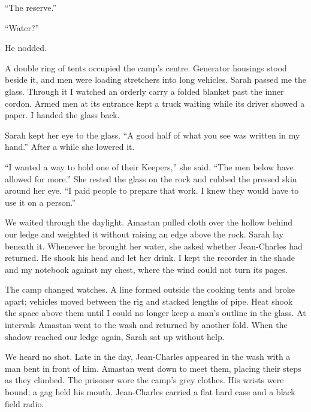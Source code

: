 ``The reserve.''\par

``Water?''\par

He nodded.\par

A double ring of tents occupied the camp's centre. Generator housings stood beside it, and men were loading stretchers into long vehicles. Sarah passed me the glass. Through it I watched an orderly carry a folded blanket past the inner cordon. Armed men at its entrance kept a truck waiting while its driver showed a paper. I handed the glass back.\par

Sarah kept her eye to the glass. ``A good half of what you see was written in my hand.'' After a while she lowered it.\par

``I wanted a way to hold one of their Keepers,'' she said. ``The men below have allowed for more.'' She rested the glass on the rock and rubbed the pressed skin around her eye. ``I paid people to prepare that work. I knew they would have to use it on a person.''\par

We waited through the daylight. Amastan pulled cloth over the hollow behind our ledge and weighted it without raising an edge above the rock. Sarah lay beneath it. Whenever he brought her water, she asked whether Jean-Charles had returned. He shook his head and let her drink. I kept the recorder in the shade and my notebook against my chest, where the wind could not turn its pages.\par

The camp changed watches. A line formed outside the cooking tents and broke apart; vehicles moved between the rig and stacked lengths of pipe. Heat shook the space above them until I could no longer keep a man's outline in the glass. At intervals Amastan went to the wash and returned by another fold. When the shadow reached our ledge again, Sarah sat up without help.\par

We heard no shot. Late in the day, Jean-Charles appeared in the wash with a man bent in front of him. Amastan went down to meet them, placing their steps as they climbed. The prisoner wore the camp's grey clothes. His wrists were bound; a gag held his mouth. Jean-Charles carried a flat hard case and a black field radio.\par

